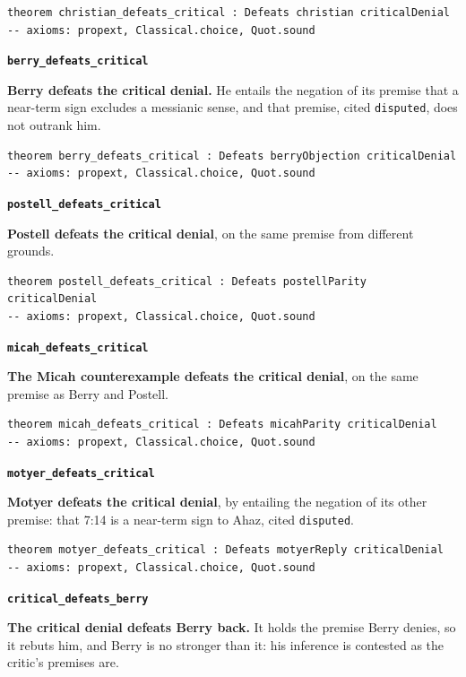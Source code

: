 \documentclass[11pt]{article}
\begin{document}
{\small\begin{verbatim}
theorem christian_defeats_critical : Defeats christian criticalDenial
-- axioms: propext, Classical.choice, Quot.sound
\end{verbatim}}
\par\medskip\noindent\textbf{\texttt{berry\_\allowbreak{}defeats\_\allowbreak{}critical}}\par\nobreak\noindent
\textbf{Berry defeats the critical denial.} He entails the negation of its premise that a near-term sign excludes a messianic sense, and that premise, cited \texttt{disputed}, does not outrank him.

{\small\begin{verbatim}
theorem berry_defeats_critical : Defeats berryObjection criticalDenial
-- axioms: propext, Classical.choice, Quot.sound
\end{verbatim}}
\par\medskip\noindent\textbf{\texttt{postell\_\allowbreak{}defeats\_\allowbreak{}critical}}\par\nobreak\noindent
\textbf{Postell defeats the critical denial}, on the same premise from different grounds.

{\small\begin{verbatim}
theorem postell_defeats_critical : Defeats postellParity criticalDenial
-- axioms: propext, Classical.choice, Quot.sound
\end{verbatim}}
\par\medskip\noindent\textbf{\texttt{micah\_\allowbreak{}defeats\_\allowbreak{}critical}}\par\nobreak\noindent
\textbf{The Micah counterexample defeats the critical denial}, on the same premise as Berry and Postell.

{\small\begin{verbatim}
theorem micah_defeats_critical : Defeats micahParity criticalDenial
-- axioms: propext, Classical.choice, Quot.sound
\end{verbatim}}
\par\medskip\noindent\textbf{\texttt{motyer\_\allowbreak{}defeats\_\allowbreak{}critical}}\par\nobreak\noindent
\textbf{Motyer defeats the critical denial}, by entailing the negation of its other premise: that 7:14 is a near-term sign to Ahaz, cited \texttt{disputed}.

{\small\begin{verbatim}
theorem motyer_defeats_critical : Defeats motyerReply criticalDenial
-- axioms: propext, Classical.choice, Quot.sound
\end{verbatim}}
\par\medskip\noindent\textbf{\texttt{critical\_\allowbreak{}defeats\_\allowbreak{}berry}}\par\nobreak\noindent
\textbf{The critical denial defeats Berry back.} It holds the premise Berry denies, so it rebuts him, and Berry is no stronger than it: his inference is contested as the critic's premises are.
\end{document}
